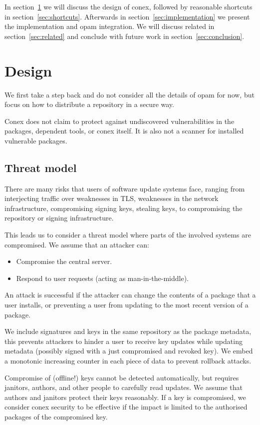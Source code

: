 \documentclass[nocopyrightspace]{sigplanconf}
\begin{document}
In section~\ref{sec:design} we will discuss the design of conex, followed by reasonable shortcuts in section~\ref{sec:shortcuts}.
Afterwards in section~\ref{sec:implementation} we present the implementation and opam integration.
We will discuss related in section~\ref{sec:related} and conclude with future work in section~\ref{sec:conclusion}.

\section{Design} \label{sec:design}
We first take a step back and do not consider all the details of opam for now, but focus on how to distribute a repository in a secure way.

Conex does not claim to protect against undiscovered vulnerabilities in the packages, dependent tools, or conex itself.
It is also not a scanner for installed vulnerable packages.

\subsection{Threat model}
There are many risks that users of software update systems face, ranging from interjecting traffic over weaknesses in TLS, weaknesses in the network infrastructure, compromising signing keys, stealing keys, to compromising the repository or signing infrastructure.

This leads us to consider a threat model where parts of the involved systems are compromised.  We assume that an attacker can:
\begin{itemize}
  \item Compromise the central server.
  \item Respond to user requests (acting as man-in-the-middle).
\end{itemize}

An attack is successful if the attacker can change the contents of a package that a user installs, or preventing a user from updating to the most recent version of a package.

We include signatures and keys in the same repository as the package metadata, this prevents attackers to hinder a user to receive key updates while updating metadata (possibly signed with a just compromised and revoked key).
We embed a monotonic increasing counter in each piece of data to prevent rollback attacks.

Compromise of (offline!) keys cannot be detected automatically, but requires janitors, authors, and other people to carefully read updates.
We assume that authors and janitors protect their keys reasonably.
If a key is compromised, we consider conex security to be effective if the impact is limited to the authorised packages of the compromised key.
\end{document}
